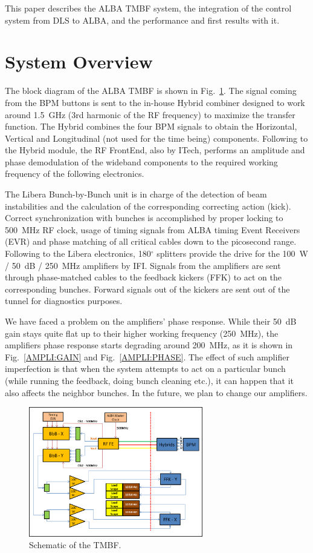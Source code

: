 \documentclass[a4paper,
              ]{jacow}
\begin{document}
This paper describes the ALBA TMBF system, the integration of the control system from DLS to ALBA, and the performance and first results with it. 

\section{System Overview}

The block diagram of the ALBA TMBF is shown in Fig.~\ref{layout}. The signal coming from the BPM buttons is sent to the in-house Hybrid combiner designed to work around 1.5~GHz (3rd harmonic of the RF frequency) to maximize the transfer function. The Hybrid combines the four BPM signals to obtain the Horizontal, Vertical and Longitudinal (not used for the time being) components. Following to the Hybrid module, the RF FrontEnd, also by ITech, performs an amplitude and phase demodulation of the wideband components to the required working frequency of the following electronics. 

The Libera Bunch-by-Bunch unit is in charge of the detection of beam instabilities and the calculation of the corresponding correcting action (kick). Correct synchronization with bunches is accomplished by proper locking to 500~MHz RF clock, usage of timing signals from ALBA timing Event Receivers (EVR) and phase matching of all critical cables down to the picosecond range. Following to the Libera electronics, 180$^\circ$ splitters provide the drive for the 100~W / 50~dB / 250~MHz amplifiers by IFI. Signals from the amplifiers are sent through phase-matched cables to the feedback kickers (FFK) to act on the corresponding bunches. Forward signals out of the kickers are sent out of the tunnel for diagnostics purposes.

We have faced a problem on the amplifiers' phase response. While their 50~dB gain stays quite flat up to their higher working frequency (250~MHz), the amplifiers phase response starts degrading around 200~MHz, as it is shown in Fig.~\ref{AMPLI:GAIN} and Fig.~\ref{AMPLI:PHASE}. The effect of such amplifier imperfection is that when the system attempts to act on a particular bunch (while running the feedback, doing bunch cleaning etc.), it can happen that it also affects the neighbor bunches. In the future, we plan to change our amplifiers.


\begin{figure}[hbt!]
   \centering
   \includegraphics[width=76mm]{img/TUPB046f1}
   \caption{Schematic of the TMBF.}
   \label{layout}
\end{figure}
\end{document}
